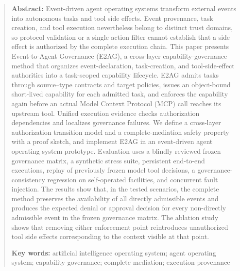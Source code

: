 \documentclass[UTF8,zihao=5,fontset=none]{ctexart}
\begin{document}
\begin{quote}\small
\textbf{Abstract:} Event-driven agent operating systems transform external events into autonomous tasks and tool side effects. Event provenance, task creation, and tool execution nevertheless belong to distinct trust domains, so protocol validation or a single action filter cannot establish that a side effect is authorized by the complete execution chain. This paper presents Event-to-Agent Governance (E2AG), a cross-layer capability-governance method that organizes event-declaration, task-creation, and tool-side-effect authorities into a task-scoped capability lifecycle. E2AG admits tasks through source--type contracts and target policies, issues an object-bound short-lived capability for each admitted task, and enforces the capability again before an actual Model Context Protocol (MCP) call reaches its upstream tool. Unified execution evidence checks authorization dependencies and localizes governance failures. We define a cross-layer authorization transition model and a complete-mediation safety property with a proof sketch, and implement E2AG in an event-driven agent operating system prototype. Evaluation uses a blindly reviewed frozen governance matrix, a synthetic stress suite, persistent end-to-end executions, replay of previously frozen model tool decisions, a governance-consistency regression on self-operated facilities, and concurrent fault injection. The results show that, in the tested scenarios, the complete method preserves the availability of all directly admissible events and produces the expected denial or approval decision for every non-directly admissible event in the frozen governance matrix. The ablation study shows that removing either enforcement point reintroduces unauthorized tool side effects corresponding to the context visible at that point.

\textbf{Key words:} artificial intelligence operating system; agent operating system; capability governance; complete mediation; execution provenance
\end{quote}


\end{document}
